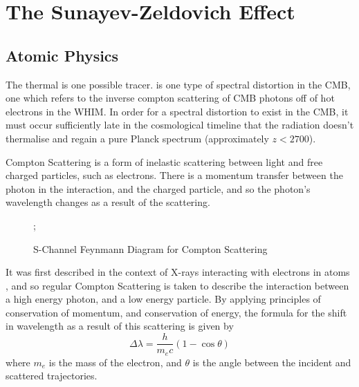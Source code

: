\chapter{The Sunayev-Zeldovich Effect}

\section{Atomic Physics}
The thermal \sze is one possible tracer. \sze is one type of spectral distortion in the CMB, one which refers to the inverse compton scattering of CMB photons off of hot electrons in the WHIM. In order for a spectral distortion to exist in the CMB, it must occur sufficiently late in the cosmological timeline that the radiation doesn't thermalise and regain a pure Planck spectrum (approximately $z < 2700$).

Compton Scattering is a form of inelastic scattering between light and free charged particles, such as electrons. There is a momentum transfer between the photon in the interaction, and the charged particle, and so the photon's wavelength changes as a result of the scattering. 

\begin{figure}[h!]
\centering
;
\label{fig:compton_scattering}
\caption{S-Channel Feynmann Diagram for Compton Scattering}
\end{figure}


It was first described in the context of X-rays interacting with electrons in atoms \citep{1923PhRv...21..483C}, and so regular Compton Scattering is taken to describe the interaction between a high energy photon, and a low energy particle. By applying principles of conservation of momentum, and conservation of energy,  the formula for the shift in wavelength as a result of this scattering is given by
\begin{equation}
	\Delta \lambda = \frac{h}{m_ec}\left(1-\cos\theta\right)
	\label{eqn:compton_shift}
\end{equation}
where $m_e$ is the mass of the electron, and $\theta$ is the angle between the incident and scattered trajectories. 

